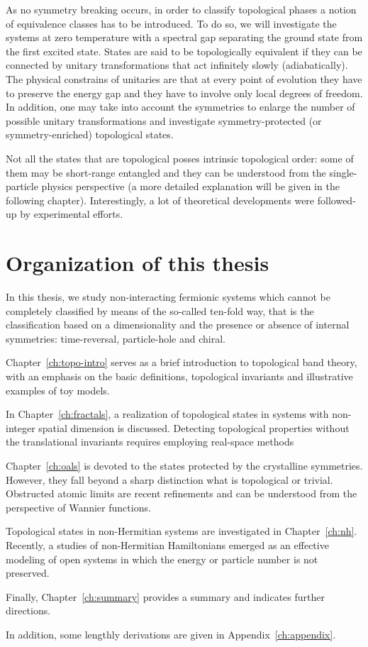 As no symmetry breaking occurs, in order to classify topological phases a notion of equivalence classes has to be introduced. To do so, we will investigate the systems at zero temperature with a spectral gap separating the ground state from the first excited state. States are said to be topologically equivalent if they can be connected by unitary transformations that act infinitely slowly (adiabatically). The physical constrains of unitaries are that at every point of evolution they have to preserve the energy gap and they have to involve only local degrees of freedom. In addition, one may take into account the symmetries to enlarge the number of possible unitary transformations and investigate symmetry-protected (or symmetry-enriched) topological states.

Not all the states that are topological posses intrinsic topological order: some of them may be short-range entangled and they can be understood from the single-particle physics perspective (a more detailed explanation will be given in the following chapter). Interestingly, a lot of theoretical developments were followed-up by experimental efforts.  

\section*{Organization of this thesis}
In this thesis, we study non-interacting fermionic systems which cannot be completely classified by means of the so-called ten-fold way, that is the classification based on a dimensionality and the presence or absence of internal symmetries: time-reversal, particle-hole and chiral.

Chapter~\ref{ch:topo-intro} serves as a brief introduction to topological band theory, with an emphasis on the basic definitions, topological invariants and illustrative examples of toy models. 

In Chapter~\ref{ch:fractals}, a realization of topological states in systems with non-integer spatial dimension is discussed. Detecting topological properties without the translational invariants requires employing real-space methods

Chapter~\ref{ch:oals} is devoted to the states protected by the crystalline symmetries. However, they fall beyond a sharp distinction what is topological or trivial. Obstructed atomic limits are recent refinements and can be understood from the perspective of Wannier functions.

Topological states in non-Hermitian systems are investigated in Chapter~\ref{ch:nh}. Recently, a studies of non-Hermitian Hamiltonians emerged as an effective modeling of open systems in which the energy or particle number is not preserved.

Finally, Chapter~\ref{ch:summary} provides a summary and indicates further directions. 

In addition, some lengthly derivations are given in Appendix~\ref{ch:appendix}.